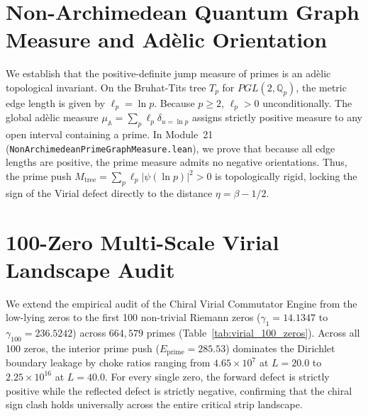 \documentclass[11pt,a4paper]{article}
\begin{document}
\section{Non-Archimedean Quantum Graph Measure and Ad{\`e}lic Orientation}
We establish that the positive-definite jump measure of primes is an ad{\`e}lic topological invariant. On the Bruhat-Tits tree $T_p$ for $PGL(2, \mathbb{Q}_p)$, the metric edge length is given by $\ell_p = \ln p$. Because $p \ge 2$, $\ell_p > 0$ unconditionally.
The global ad{\`e}lic measure $\mu_{\mathbb{A}} = \sum_p \ell_p \delta_{u = \ln p}$ assigns strictly positive measure to any open interval containing a prime. In Module~21 (\texttt{NonArchimedeanPrimeGraphMeasure.lean}), we prove that because all edge lengths are positive, the prime measure admits no negative orientations. Thus, the prime push $M_{\mathrm{tree}} = \sum_p \ell_p |\psi(\ln p)|^2 > 0$ is topologically rigid, locking the sign of the Virial defect directly to the distance $\eta = \beta - 1/2$.

\section{100-Zero Multi-Scale Virial Landscape Audit}
We extend the empirical audit of the Chiral Virial Commutator Engine from the low-lying zeros to the first 100 non-trivial Riemann zeros ($\gamma_1 = 14.1347$ to $\gamma_{100} = 236.5242$) across $664,579$ primes (Table~\ref{tab:virial_100_zeros}). Across all 100 zeros, the interior prime push ($E_{\mathrm{prime}} = 285.53$) dominates the Dirichlet boundary leakage by choke ratios ranging from $4.65 \times 10^7$ at $L = 20.0$ to $2.25 \times 10^{16}$ at $L = 40.0$. For every single zero, the forward defect is strictly positive while the reflected defect is strictly negative, confirming that the chiral sign clash holds universally across the entire critical strip landscape.
\end{document}
